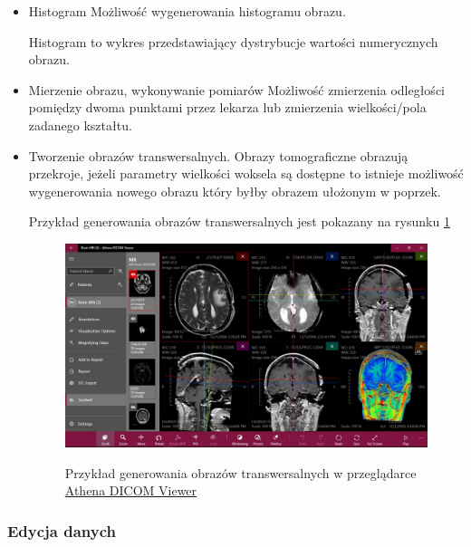 \begin{itemize}
      \item Histogram
            Możliwość wygenerowania histogramu obrazu.

            Histogram to wykres przedstawiający dystrybucje wartości numerycznych obrazu.

      \item Mierzenie obrazu, wykonywanie pomiarów
            Możliwość zmierzenia odległości pomiędzy dwoma punktami przez lekarza lub zmierzenia wielkości/pola zadanego kształtu.

      \item Tworzenie obrazów transwersalnych.
            Obrazy tomograficzne obrazują przekroje, jeżeli parametry wielkości woksela są dostępne to istnieje możliwość wygenerowania nowego obrazu który byłby obrazem ułożonym w poprzek.

            Przykład generowania obrazów transwersalnych jest pokazany na rysunku \ref{fig:dicomviewer003}

            \begin{figure}[!htbp]
                  \caption{Przykład generowania obrazów transwersalnych w przeglądarce \href{https://athenadicomviewer.com/}{Athena DICOM Viewer}}
                  \includegraphics[width=\textwidth]{img/dicom-viewer-003.jpeg}
                  \centering
                  \label{fig:dicomviewer003}
            \end{figure}
\end{itemize}

\subsubsection{Edycja danych}

